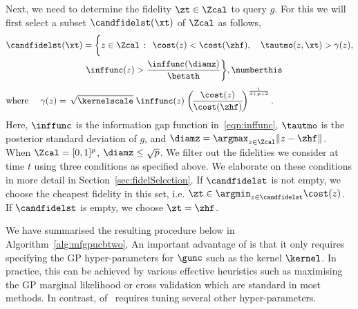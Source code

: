 Next, we need to determine the fidelity $\zt\in\Zcal$ to query $g$.
For this we will first select a subset $\candfidelst(\xt)$ of $\Zcal$ as follows,
\begin{align*}
&\candfidelst(\xt) = 
    \bigg\{z\in\Zcal\,:\,\;\cost(z) < \cost(\zhf),
    \quad\tautmo(z,\xt) > \gamma(z), \\
    &\hspace{1.25in}\inffunc(z) > \frac{\inffunc(\diamz) }{\betath}
      \bigg\}, 
\numberthis\label{eqn:candfidelst}
\\[0.05in]
&\textrm{where } \quad\gamma(z) =\,
      \sqrt{\kernelscale}\;
        \inffunc(z)\;
        \bigg(\hspace{-0.02in}\frac{\cost(z)}{\cost(\zhf)}
        \hspace{-0.02in}\bigg)^{\frac{1}{d+p+2}}
\,.
\end{align*}
Here, $\inffunc$ is the information gap function in~\eqref{eqn:inffunc},
$\tautmo$ is the posterior standard deviation of $g$,
and $\diamz = \argmax_{z\in\Zcal}\|z-\zhf\|$.
When $\Zcal=[0,1]^p$, $\diamz \leq \sqrt{p}$.
We filter out the fidelities we consider at time $t$ using three conditions as
specified above.
We elaborate on these conditions in more detail in Section~\ref{sec:fidelSelection}.
If $\candfidelst$ is not empty, we choose the cheapest fidelity in this
set, i.e. $\zt \in \argmin_{z\in\candfidelst}\cost(z)$.
If $\candfidelst$ is empty, we choose $\zt = \zhf$.

We have summarised the resulting procedure below in Algorithm~\ref{alg:mfgpucbtwo}.
An important advantage of \mfgpucbtwos is that it only requires specifying
the GP hyper-parameters for $\gunc$ such as the kernel $\kernel$.
In practice, this can be achieved by various effective heuristics such as maximising the
GP marginal likelihood or cross validation which are standard in most \bayos{} methods.
In contrast, \mfgpucbones of~\citet{kandasamy16mfbo} requires tuning several other
hyper-parameters.


